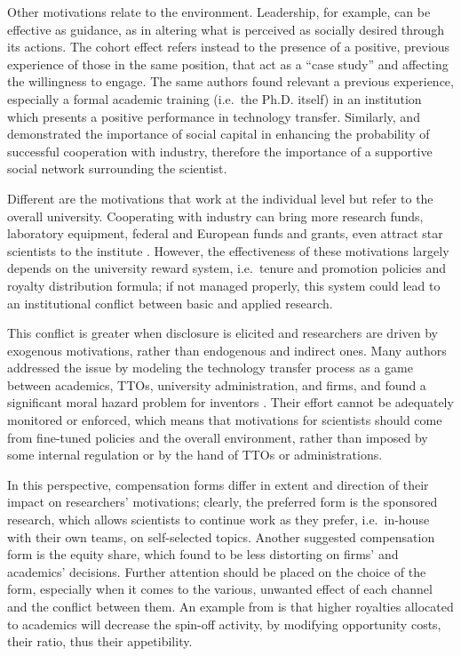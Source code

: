 Other motivations relate to the environment. Leadership, for example, can be effective as guidance, as in altering what is perceived as socially desired through its actions. The cohort effect \citep{Bercovitz2006} refers instead to the presence of a positive, previous experience of those in the same position, that act as a \enquote{case study} and affecting the willingness to engage. The same authors found relevant a previous experience, especially a formal academic training (i.e.\ the Ph.D. itself) in an institution which presents a positive performance in technology transfer. Similarly, \citet{Murray2004} and \citet{Link2007} demonstrated the importance of social capital in enhancing the probability of successful cooperation with industry, therefore the importance of a supportive social network surrounding the scientist.

Different are the motivations that work at the individual level but refer to the overall university. Cooperating with industry can bring more research funds, laboratory equipment, federal and European funds and grants, even attract star scientists to the institute \citep{OShea2004, Baldini2007, DEste2007}. However, the effectiveness of these motivations largely depends on the university reward system, i.e.\ tenure and promotion policies and royalty distribution formula; if not managed properly, this system could lead to an institutional conflict between basic and applied research. 

This conflict is greater when disclosure is elicited and researchers are driven by exogenous motivations, rather than endogenous and indirect ones. Many authors addressed the issue by modeling the technology transfer process as a game between academics, TTOs, university administration, and firms, and found a significant moral hazard problem for inventors \citep{Jensen1998}. Their effort cannot be adequately monitored or enforced, which means that motivations for scientists should come from fine-tuned policies and the overall environment, rather than imposed by some internal regulation or by the hand of TTOs or administrations. 

In this perspective, compensation forms differ in extent and direction of their impact on researchers' motivations; clearly, the preferred form is the sponsored research, which allows scientists to continue work as they prefer, i.e.\ in-house with their own teams, on self-selected topics. Another suggested compensation form is the equity share, which \citet{Jensen1998} found to be less distorting on firms' and academics' decisions. Further attention should be placed on the choice of the form, especially when it comes to the various, unwanted effect of each channel and the conflict between them. An example from \citet{OShea2004} is that higher royalties allocated to academics will decrease the spin-off activity, by modifying opportunity costs, their ratio, thus their appetibility.

